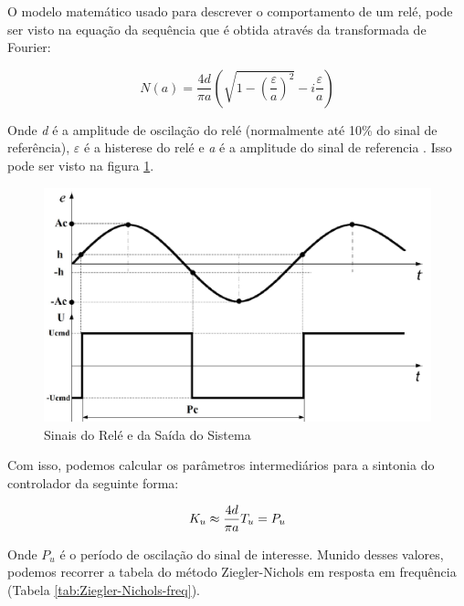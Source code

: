 O modelo matemático usado para descrever o comportamento de um relé, pode ser visto na equação da sequência que é obtida através da transformada de Fourier:

\begin{equation}
  N(a)=\frac{4d}{\pi a}\left(\sqrt{1-\left(\frac{\varepsilon}{a}\right)^{2}}-i\frac{\varepsilon}{a}\right) 
\end{equation}

Onde \textit{d} é a amplitude de oscilação do relé (normalmente até 10\% do sinal de referência), \textit{$\varepsilon$} é a histerese do relé e \textit{a} é a amplitude do sinal de referencia \cite{Levine1996}. Isso pode ser visto na figura \ref{fig:relay_signals}.

\begin{figure}[!ht]
  \caption{Sinais do Relé e da Saída do Sistema}
  \begin{center}
      \includegraphics[scale=0.75]{img/relay_giap_p2}
  \end{center}
  \label{fig:relay_signals}
\end{figure}

Com isso, podemos calcular os parâmetros intermediários para a sintonia do controlador da seguinte forma:

\begin{equation}
  K_u \approx \frac{4d}{\pi a} \\
  T_u = P_u
\end{equation}

Onde $P_u$ é o período de oscilação do sinal de interesse. Munido desses valores, podemos recorrer a tabela do método Ziegler-Nichols em resposta em frequência (Tabela \ref{tab:Ziegler-Nichols-freq}).



